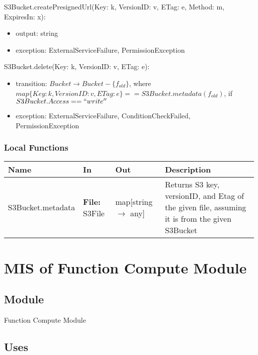 \documentclass[12pt, titlepage]{article}
\begin{document}
{  \noindent S3Bucket.createPresignedUrl(Key: k, VersionID: v, ETag: e,
  Method: m, ExpiresIn: x):
  \begin{itemize}
    \item output: string
    \item exception: ExternalServiceFailure, PermissionException
  \end{itemize}

  \noindent S3Bucket.delete(Key: k, VersionID: v, ETag: e):
  \begin{itemize}
    \item transition: $Bucket \rightarrow Bucket - \{f_{old}\}$, where
      $map\{Key: k, VersionID: v, ETag:
      e\}==S3Bucket.metadata(f_{old})$, if $S3Bucket.Access == ``write''$
    \item exception: ExternalServiceFailure, ConditionCheckFailed,
      PermissionException
  \end{itemize}

  \subsubsection{Local Functions}

  \begin{center}
    \begin{tabular}{>{\raggedright}p{4cm} >{\raggedright}p{3cm}
      >{\raggedright}p{3.5cm} p{5.5cm}}
      \hline
      \textbf{Name} & \textbf{In} & \textbf{Out} & \textbf{Description} \\
      \hline
      S3Bucket.metadata & \textbf{File:} S3File & map[string
      $\rightarrow$ any] & Returns S3 key, versionID, and Etag of the
      given file, assuming it is from the given S3Bucket \\
      \hline
    \end{tabular}
  \end{center}

  \section{MIS of Function Compute Module}
  \label{sec:FC}

  \subsection{Module}

  Function Compute Module

  \subsection{Uses}

}
\end{document}
